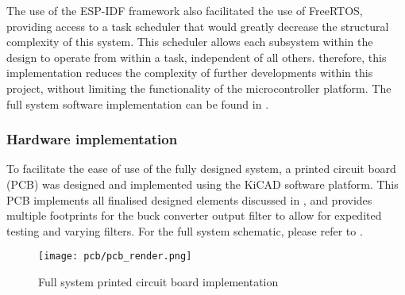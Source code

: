 The use of the ESP-IDF framework also facilitated the use of FreeRTOS, providing access to a task scheduler that would greatly decrease the structural complexity of this system. This scheduler allows each subsystem within the design to operate from within a task, independent of all others. therefore, this implementation reduces the complexity of further developments within this project, without limiting the functionality of the microcontroller platform. The full system software implementation can be found in .


\subsubsection*{Hardware implementation}

To facilitate the ease of use of the fully designed system, a printed circuit board (PCB) was designed and implemented using the KiCAD software platform. This PCB implements all finalised designed elements discussed in , and provides multiple footprints for the buck converter output filter to allow for expedited testing and varying filters. For the full system schematic, please refer to .

\begin{figure}[!h]
    \centering
    \texttt{[image: pcb/pcb\_render.png]}
    \caption{Full system printed circuit board implementation}
    \label{F:implemented_pcb}
\end{figure}

